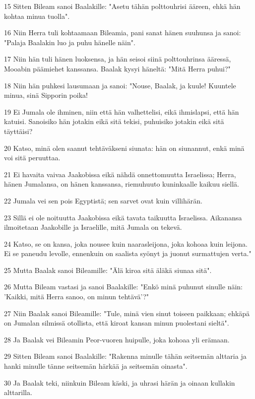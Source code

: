 \par 15 Sitten Bileam sanoi Baalakille: "Asetu tähän polttouhrisi ääreen, ehkä hän kohtaa minua tuolla".
\par 16 Niin Herra tuli kohtaamaan Bileamia, pani sanat hänen suuhunsa ja sanoi: "Palaja Baalakin luo ja puhu hänelle näin".
\par 17 Niin hän tuli hänen luoksensa, ja hän seisoi siinä polttouhrinsa ääressä, Mooabin päämiehet kanssansa. Baalak kysyi häneltä: "Mitä Herra puhui?"
\par 18 Niin hän puhkesi lausumaan ja sanoi: "Nouse, Baalak, ja kuule! Kuuntele minua, sinä Sipporin poika!
\par 19 Ei Jumala ole ihminen, niin että hän valhettelisi, eikä ihmislapsi, että hän katuisi. Sanoisiko hän jotakin eikä sitä tekisi, puhuisiko jotakin eikä sitä täyttäisi?
\par 20 Katso, minä olen saanut tehtäväkseni siunata: hän on siunannut, enkä minä voi sitä peruuttaa.
\par 21 Ei havaita vaivaa Jaakobissa eikä nähdä onnettomuutta Israelissa; Herra, hänen Jumalansa, on hänen kanssansa, riemuhuuto kuninkaalle kaikuu siellä.
\par 22 Jumala vei sen pois Egyptistä; sen sarvet ovat kuin villihärän.
\par 23 Sillä ei ole noituutta Jaakobissa eikä tavata taikuutta Israelissa. Aikanansa ilmoitetaan Jaakobille ja Israelille, mitä Jumala on tekevä.
\par 24 Katso, se on kansa, joka nousee kuin naarasleijona, joka kohoaa kuin leijona. Ei se paneudu levolle, ennenkuin on saalista syönyt ja juonut surmattujen verta."
\par 25 Mutta Baalak sanoi Bileamille: "Älä kiroa sitä äläkä siunaa sitä".
\par 26 Mutta Bileam vastasi ja sanoi Baalakille: "Enkö minä puhunut sinulle näin: 'Kaikki, mitä Herra sanoo, on minun tehtävä'?"
\par 27 Niin Baalak sanoi Bileamille: "Tule, minä vien sinut toiseen paikkaan; ehkäpä on Jumalan silmissä otollista, että kiroat kansan minun puolestani sieltä".
\par 28 Ja Baalak vei Bileamin Peor-vuoren huipulle, joka kohoaa yli erämaan.
\par 29 Sitten Bileam sanoi Baalakille: "Rakenna minulle tähän seitsemän alttaria ja hanki minulle tänne seitsemän härkää ja seitsemän oinasta".
\par 30 Ja Baalak teki, niinkuin Bileam käski, ja uhrasi härän ja oinaan kullakin alttarilla.

